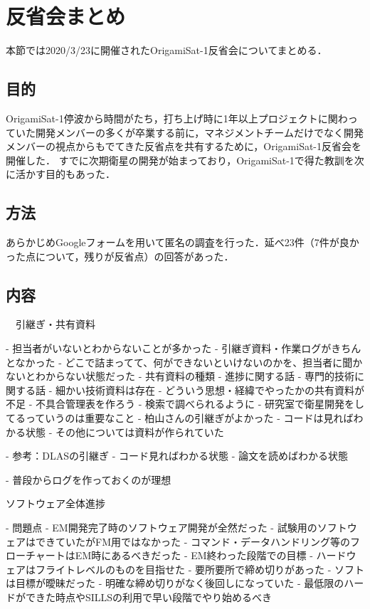\section{反省会まとめ}


本節では2020/3/23に開催されたOrigamiSat-1反省会についてまとめる．

\subsection{目的}
OrigamiSat-1停波から時間がたち，打ち上げ時に1年以上プロジェクトに関わっていた開発メンバーの多くが卒業する前に，マネジメントチームだけでなく開発メンバーの視点からもでてきた反省点を共有するために，OrigamiSat-1反省会を開催した．
すでに次期衛星の開発が始まっており，OrigamiSat-1で得た教訓を次に活かす目的もあった．

\subsection{方法}
あらかじめGoogleフォームを用いて匿名の調査を行った．延べ23件（7件が良かった点について，残りが反省点）の回答があった．





\subsection{内容}
　引継ぎ・共有資料

- 担当者がいないとわからないことが多かった
- 引継ぎ資料・作業ログがきちんとなかった
- どこで詰まってて、何ができないといけないのかを、担当者に聞かないとわからない状態だった
- 共有資料の種類
- 進捗に関する話
- 専門的技術に関する話
- 細かい技術資料は存在
- どういう思想・経緯でやったかの共有資料が不足
- 不具合管理表を作ろう
- 検索で調べられるように
- 研究室で衛星開発をしてるっていうのは重要なこと
- 柏山さんの引継ぎがよかった
- コードは見ればわかる状態
- その他については資料が作られていた

- 参考：DLASの引継ぎ
- コード見ればわかる状態
- 論文を読めばわかる状態

- 普段からログを作っておくのが理想

ソフトウェア全体進捗

- 問題点
- EM開発完了時のソフトウェア開発が全然だった
- 試験用のソフトウェアはできていたがFM用ではなかった
- コマンド・データハンドリング等のフローチャートはEM時にあるべきだった
- EM終わった段階での目標
- ハードウェアはフライトレベルのものを目指せた
- 要所要所で締め切りがあった
- ソフトは目標が曖昧だった
- 明確な締め切りがなく後回しになっていた
- 最低限のハードができた時点やSILLSの利用で早い段階でやり始めるべき

